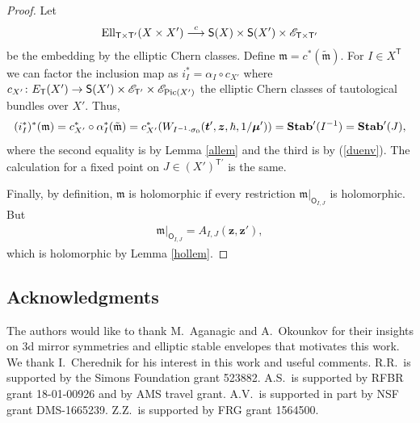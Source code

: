 \documentclass[pdftex]{sigma}
\newcommand{\bT}{\mathsf{T}}
\newcommand{\Or}{\textsf{O}}
\newcommand{\cE}{\mathscr{E}}
\def\ttt{{\boldsymbol t}}
\def\zz{{\boldsymbol z}}
\def\mub{{\boldsymbol\mu}}
\numberwithin{equation}{section}
\begin{document}
\begin{proof} Let
 \begin{gather*}
 {\rm Ell}_{\bT\times\bT'}(X\times X' )\stackrel{c}{\longrightarrow} \textsf{S}(X)\times \textsf{S}(X') \times \cE_{\bT\times \bT'}
 \end{gather*}
 be the embedding by the elliptic Chern classes. Define ${\mathfrak{m}}=c^{*}(\tilde{{\mathfrak{m}}})$.
 For $I\in X^{\bT}$ we can factor the inclusion map as $i^{*}_{I}=\alpha_{I}\circ c_{X'}$ where
 $ c_{X'}\colon E_{\bT}(X') \rightarrow \mathsf{S}(X')\times \cE_{\bT'}\times \cE_{{\rm Pic}(X')} $
 the elliptic Chern classes of tautological bundles over $X'$. Thus,
 \begin{gather*}
 (i^{*}_{I})^{*}(\mathfrak{m})=c_{X'}^{*} \circ \alpha^{*}_{I} (\tilde{\mathfrak{m}}) = c_{X'}^{*} (W_{I^{-1}\cdot \sigma_0}(\ttt',\zz,\hbar,1/\mub'))={\bf Stab}'(I^{-1})={\bf Stab}'(J),
 \end{gather*}
 where the second equality is by Lemma \ref{allem} and the third is by (\ref{duenv}). The calculation for a fixed point on $J \in (X')^{\bT'}$ is the same.

 Finally, by definition, ${\mathfrak{m}}$ is holomorphic if every restriction $ {\mathfrak{m}} |_{\Or_{I,J}}$ is holomorphic. But
 \begin{gather*}
 {\mathfrak{m}} |_{\Or_{I,J}}=A_{I,J}(\zz,\zz'),
 \end{gather*}
 which is holomorphic by Lemma \ref{hollem}.
\end{proof}

\subsection*{Acknowledgments}

The authors would like to thank M.~Aganagic and A.~Okounkov for their insights on 3d mirror symmetries and elliptic stable envelopes that motivates this work. We thank I.~Cherednik for his interest in this work and useful comments. R.R.~is supported by the Simons Foundation grant 523882. A.S.~is supported by RFBR grant 18-01-00926 and by AMS travel grant. A.V.~is supported in part by NSF grant DMS-1665239. Z.Z.~is supported by FRG grant 1564500.
\end{document}
